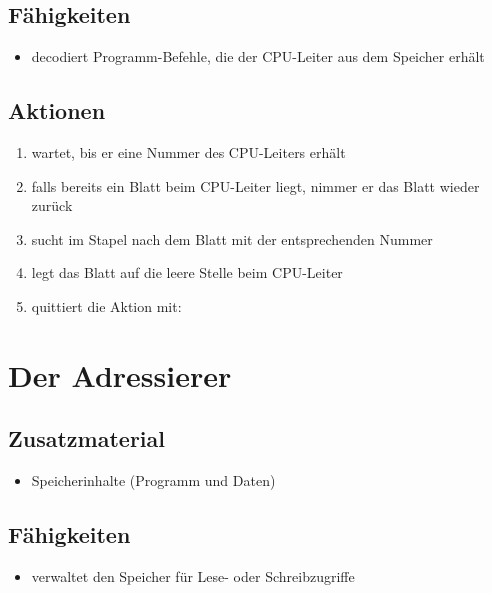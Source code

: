 \documentclass[a4paper]{kinet-intern}
\begin{document}
\subsection*{Fähigkeiten}
\begin{itemize}
	\item decodiert Programm-Befehle, die der CPU-Leiter aus dem Speicher erhält
\end{itemize}

\subsection*{Aktionen}
\begin{enumerate}
	\item wartet, bis er eine Nummer des CPU-Leiters erhält
	\item falls bereits ein Blatt beim CPU-Leiter liegt, nimmer er das Blatt wieder zurück
	\item sucht im Stapel nach dem Blatt mit der entsprechenden Nummer
	\item legt das Blatt auf die leere Stelle beim CPU-Leiter
	\item quittiert die Aktion mit: 
\end{enumerate}


\vspace{1cm}
\section*{Der Adressierer}

\subsection*{Zusatzmaterial}
\begin{itemize}
	\item Speicherinhalte (Programm und Daten)
\end{itemize}

\subsection*{Fähigkeiten}
\begin{itemize}
	\item verwaltet den Speicher für Lese- oder Schreibzugriffe
\end{itemize}
\end{document}
